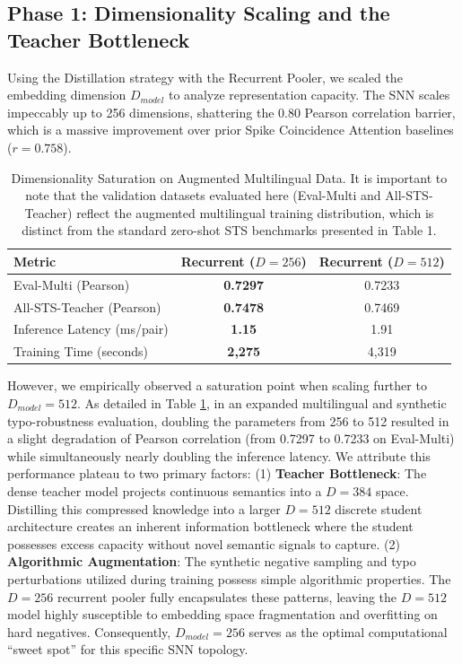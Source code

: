 \documentclass{article} %
\begin{document}
\subsection{Phase 1: Dimensionality Scaling and the Teacher Bottleneck}
Using the Distillation strategy with the Recurrent Pooler, we scaled the embedding dimension $D_{model}$ to analyze representation capacity. The SNN scales impeccably up to 256 dimensions, shattering the 0.80 Pearson correlation barrier, which is a massive improvement over prior Spike Coincidence Attention baselines \citep{coincidence2026} ($r=0.758$). 

\begin{table}[ht]
\centering
\caption{Dimensionality Saturation on Augmented Multilingual Data. It is important to note that the validation datasets evaluated here (Eval-Multi and All-STS-Teacher) reflect the augmented multilingual training distribution, which is distinct from the standard zero-shot STS benchmarks presented in Table 1.}
\begin{tabular}{lcc}
\toprule
\textbf{Metric} & \textbf{Recurrent ($D=256$)} & \textbf{Recurrent ($D=512$)} \\
\midrule
Eval-Multi (Pearson) & \textbf{0.7297} & 0.7233 \\
All-STS-Teacher (Pearson) & \textbf{0.7478} & 0.7469 \\
Inference Latency (ms/pair) & \textbf{1.15} & 1.91 \\
Training Time (seconds) & \textbf{2,275} & 4,319 \\
\bottomrule
\end{tabular}
\label{tab:multilingual_saturation}
\end{table}

However, we empirically observed a saturation point when scaling further to $D_{model} = 512$. As detailed in Table \ref{tab:multilingual_saturation}, in an expanded multilingual and synthetic typo-robustness evaluation, doubling the parameters from 256 to 512 resulted in a slight degradation of Pearson correlation (from 0.7297 to 0.7233 on Eval-Multi) while simultaneously nearly doubling the inference latency. We attribute this performance plateau to two primary factors: (1) \textbf{Teacher Bottleneck}: The dense teacher model projects continuous semantics into a $D=384$ space. Distilling this compressed knowledge into a larger $D=512$ discrete student architecture creates an inherent information bottleneck where the student possesses excess capacity without novel semantic signals to capture. (2) \textbf{Algorithmic Augmentation}: The synthetic negative sampling and typo perturbations utilized during training possess simple algorithmic properties. The $D=256$ recurrent pooler fully encapsulates these patterns, leaving the $D=512$ model highly susceptible to embedding space fragmentation and overfitting on hard negatives. Consequently, $D_{model} = 256$ serves as the optimal computational ``sweet spot'' for this specific SNN topology.
\end{document}
